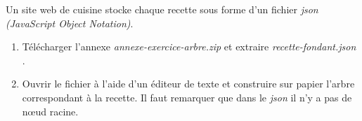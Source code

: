 \documentclass[a4paper,11pt]{article}
\begin{document}
\begin{Form}
\begin{exo}
Un site web de cuisine stocke chaque recette sous forme d'un fichier \emph{json (JavaScript Object Notation)}.
\begin{enumerate}
\item Télécharger l'annexe \emph{annexe-exercice-arbre.zip} et extraire \emph{recette-fondant.json} .
\item Ouvrir le fichier à l'aide d'un éditeur de texte et construire sur papier l'arbre correspondant à la recette. Il faut remarquer que dans le \emph{json} il n'y a pas de nœud racine.
\end{enumerate}
\end{exo}
\end{Form}
\end{document}
